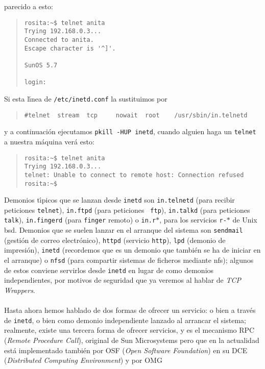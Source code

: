 parecido a esto:
\tt
\begin{quote}
\begin{verbatim}
rosita:~$ telnet anita
Trying 192.168.0.3...
Connected to anita.
Escape character is '^]'.

SunOS 5.7

login:
\end{verbatim}
\end{quote}
\rm
Si esta l\'{\i}nea de {\tt /etc/inetd.conf} la sustituimos por 
\tt
\begin{quote}
\begin{verbatim}
#telnet  stream  tcp     nowait  root    /usr/sbin/in.telnetd
\end{verbatim}
\end{quote}
\rm
y a continuaci\'on ejecutamos {\tt pkill -HUP inetd}, cuando alguien haga un
{\tt telnet} a nuestra m\'aquina ver\'a esto:
\tt
\begin{quote}
\begin{verbatim}
rosita:~$ telnet anita 
Trying 192.168.0.3...
telnet: Unable to connect to remote host: Connection refused
rosita:~$
\end{verbatim}
\end{quote}
\rm
Demonios t\'{\i}picos que se lanzan desde {\tt inetd} son {\tt in.telnetd}
(para recibir peticiones {\tt telnet}), {\tt in.ftpd} (para peticiones {\tt 
ftp}), {\tt in.talkd} (para peticiones {\tt talk}), {\tt in.fingerd} (para
{\tt finger} remoto) o {\tt in.r$\ast$}, para los servicios {\tt r-$\ast$} de
Unix {\sc bsd}. Demonios que se suelen lanzar en el arranque del sistema
son {\tt sendmail} (gesti\'on de correo electr\'onico), {\tt httpd} (servicio
{\tt http}), {\tt lpd} (demonio de impresi\'on), {\tt inetd} (recordemos que
es un demonio que tambi\'en se ha de iniciar en el arranque) o {\tt nfsd}
(para compartir sistemas de ficheros mediante {\sc nfs}); algunos de estos
conviene servirlos desde {\tt inetd} en lugar de como demonios independientes,
por motivos de seguridad que ya veremos al hablar de {\it TCP Wrappers}.\\
\\Hasta ahora hemos hablado de dos formas de ofrecer un servicio: o bien a
trav\'es de {\tt inetd}, o bien como demonio independiente lanzado al arrancar
el sistema; realmente, existe una tercera forma de ofrecer servicios, y es el
mecanismo RPC ({\it Remote Procedure Call}), original de Sun Microsystems pero
que en la actualidad est\'a implementado tambi\'en por OSF ({\it Open Software
Foundation}) en su DCE ({\it Distributed Computing Environment}) y por OMG
